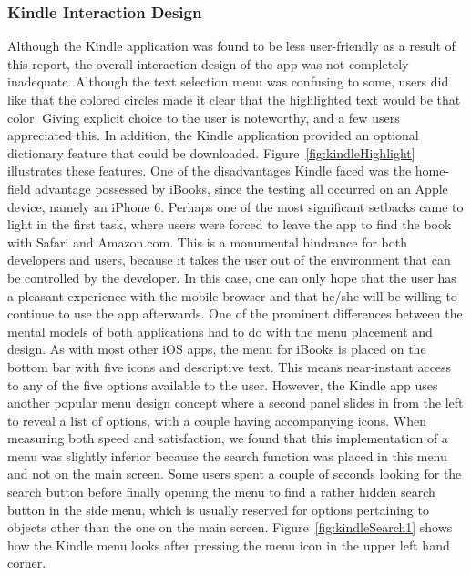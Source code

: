 \documentclass[journal, a4paper]{IEEEtran}
\begin{document}
\subsubsection{Kindle Interaction Design}
	Although the Kindle application was found to be less user-friendly as a result of this report, the overall interaction design of the app was not completely inadequate. Although the text selection menu was confusing to some, users did like that the colored circles made it clear that the highlighted text would be that color. Giving explicit choice to the user is noteworthy, and a few users appreciated this. In addition, the Kindle application provided an optional dictionary feature that could be downloaded. Figure~\ref{fig:kindleHighlight} illustrates these features.
    One of the disadvantages Kindle faced was the home-field advantage possessed by iBooks, since the testing all occurred on an Apple device, namely an iPhone 6. Perhaps one of the most significant setbacks came to light in the first task, where users were forced to leave the app to find the book with Safari and Amazon.com. This is a monumental hindrance for both developers and users, because it takes the user out of the environment that can be controlled by the developer. In this case, one can only hope that the user has a pleasant experience with the mobile browser and that he/she will be willing to continue to use the app afterwards.
    One of the prominent differences between the mental models of both applications had to do with the menu placement and design. As with most other iOS apps, the menu for iBooks is placed on the bottom bar with five icons and descriptive text. This means near-instant access to any of the five options available to the user. However, the Kindle app uses another popular menu design concept where a second panel slides in from the left to reveal a list of options, with a couple having accompanying icons. When measuring both speed and satisfaction, we found that this implementation of a menu was slightly inferior because the search function was placed in this menu and not on the main screen. Some users spent a couple of seconds looking for the search button before finally opening the menu to find a rather hidden search button in the side menu, which is usually reserved for options pertaining to objects other than the one on the main screen. Figure~\ref{fig:kindleSearch1} shows how the Kindle menu looks after pressing the menu icon in the upper left hand corner.
    
\end{document}
